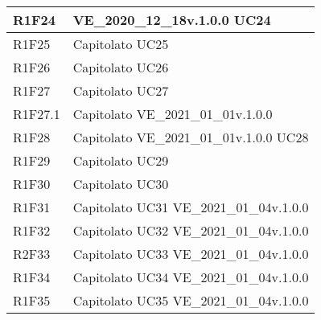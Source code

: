 \begin{center}
\begin{longtable}{|p{22mm}|p{44mm}|}
		R1F24 &
		VE\_2020\_12\_18v.1.0.0 \newline
		UC24 
		\\
		\hline
		
		R1F25 &
		Capitolato \newline
		UC25 
		\\
		\hline
		
		R1F26 &
		Capitolato \newline
		UC26 
		\\
		\hline
		
		R1F27 &
		Capitolato \newline
		UC27 
		\\
		\hline
		
		R1F27.1 &
		Capitolato \newline
		VE\_2021\_01\_01v.1.0.0 
		\\
		\hline
		
		R1F28 &
		Capitolato \newline
		VE\_2021\_01\_01v.1.0.0 \newline
		UC28 
		\\
		\hline
		
		R1F29 &
		Capitolato \newline
		UC29 
		\\
		\hline
		
		R1F30 &
		Capitolato \newline
		UC30 
		\\
		\hline
		
		R1F31 &
		Capitolato \newline
		UC31 \newline
		VE\_2021\_01\_04v.1.0.0 
		\\
		\hline
		
		R1F32 &
		Capitolato \newline
		UC32 \newline
		VE\_2021\_01\_04v.1.0.0 
		\\
		\hline
		
		R2F33 &
		Capitolato \newline
		UC33 \newline
		VE\_2021\_01\_04v.1.0.0 
		\\
		\hline
		
		R1F34 &
		Capitolato \newline
		UC34 \newline
		VE\_2021\_01\_04v.1.0.0 
		\\
		\hline
		
		R1F35 &
		Capitolato \newline
		UC35 \newline
		VE\_2021\_01\_04v.1.0.0 
		\\
		\hline
		

\end{longtable}
\end{center}
